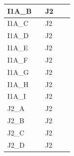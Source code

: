 \begin{longtable}{|l|l|l|l|l|}
I1A\_B                                               &                          & J2                     &                         &                                               \\ \hline
I1A\_C                                               &                          & J2                     &                         &                                               \\ \hline
I1A\_D                                               &                          & J2                     &                         &                                               \\ \hline
I1A\_E                                               &                          & J2                     &                         &                                               \\ \hline
I1A\_F                                               &                          & J2                     &                         &                                               \\ \hline
I1A\_G                                               &                          & J2                     &                         &                                               \\ \hline
I1A\_H                                               &                          & J2                     &                         &                                               \\ \hline
I1A\_I                                               &                          & J2                     &                         &                                               \\ \hline
J2\_A                                                &                          & J2                     &                         &                                               \\ \hline
J2\_B                                                &                          & J2                     &                         &                                               \\ \hline
J2\_C                                                &                          & J2                     &                         &                                               \\ \hline
J2\_D                                                &                          & J2                     &                         &                                               \\ \hline

\end{longtable}
